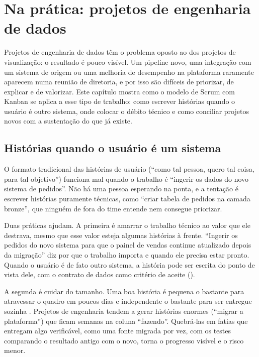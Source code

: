 \chapter{Na prática: projetos de engenharia de dados}
\label{cap:proj-engenharia}

Projetos de engenharia de dados têm o problema oposto ao dos projetos de visualização: o
resultado é pouco visível. Um pipeline novo, uma integração com um sistema de origem ou uma
melhoria de desempenho na plataforma raramente aparecem numa reunião de diretoria, e por isso
são difíceis de priorizar, de explicar e de valorizar. Este capítulo mostra como o modelo de
Scrum com Kanban se aplica a esse tipo de trabalho: como escrever histórias quando o usuário
é outro sistema, onde colocar o débito técnico e como conciliar projetos novos com a
sustentação do que já existe.

\section{Histórias quando o usuário é um sistema}
\label{sec:historias-tecnicas}

O formato tradicional das histórias de usuário (\enquote{como tal pessoa, quero tal coisa,
para tal objetivo}) funciona mal quando o trabalho é \enquote{ingerir os dados do novo
sistema de pedidos}. Não há uma pessoa esperando na ponta, e a tentação é escrever histórias
puramente técnicas, como \enquote{criar tabela de pedidos na camada bronze}, que ninguém de
fora do time entende nem consegue priorizar.

Duas práticas ajudam. A primeira é amarrar o trabalho técnico ao valor que ele destrava, mesmo
que esse valor esteja algumas histórias à frente. \enquote{Ingerir os pedidos do novo sistema
para que o painel de vendas continue atualizado depois da migração} diz por que o trabalho
importa e quando ele precisa estar pronto. Quando o usuário é de fato outro sistema, a história
pode ser escrita do ponto de vista dele, com o contrato de dados como critério de aceite
().

A segunda é cuidar do tamanho. Uma boa história é pequena o bastante para atravessar o quadro
em poucos dias e independente o bastante para ser entregue sozinha \parencite{cohn2004}.
Projetos de engenharia tendem a gerar histórias enormes (\enquote{migrar a plataforma}) que
ficam semanas na coluna \enquote{fazendo}. Quebrá-las em fatias que entregam algo verificável,
como uma fonte migrada por vez, com os testes comparando o resultado antigo com o novo, torna
o progresso visível e o risco menor.

